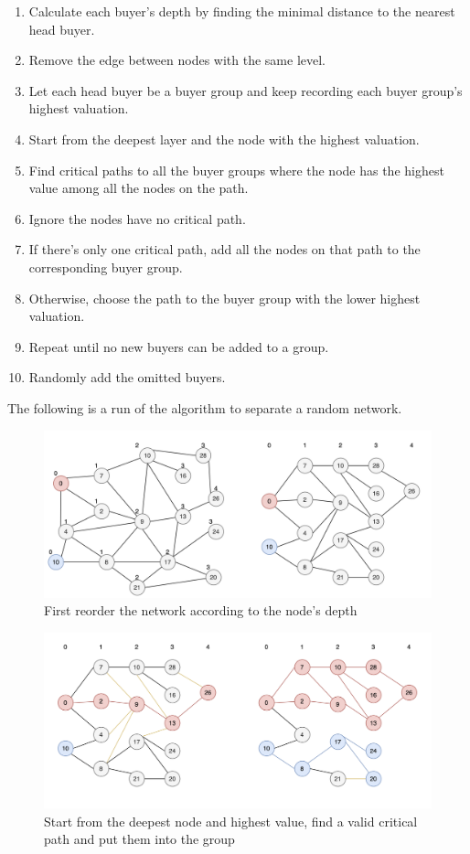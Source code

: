 \documentclass[format=acmsmall, review=false, natbib=false]{acmart}
\begin{document}
\begin{tcolorbox}[title=Algorithm: Graph Division]
	\begin{enumerate}
		\item Calculate each buyer's depth by finding the minimal distance to the nearest head buyer.
		\item Remove the edge between nodes with the same level.
		\item Let each head buyer be a buyer group and keep recording each buyer group's highest valuation.
		\item Start from the deepest layer and the node with the highest valuation.
		\item Find critical paths to all the buyer groups where the node has the highest value among all the nodes on the path.
		\item Ignore the nodes have no critical path.
		\item If there's only one critical path, add all the nodes on that path to the corresponding buyer group.
		\item Otherwise, choose the path to the buyer group with the lower highest valuation.
		\item  Repeat until no new buyers can be added to a group.
		\item Randomly add the omitted buyers.
	\end{enumerate}
\end{tcolorbox}
The following is a run of the algorithm to separate a random network.
\begin{figure}
	\centering
	\includegraphics[width = \textwidth]{image/Graph01.png}
	\caption{First reorder the network according to the node's depth}
	\label{fig:GraphDivision1}
\end{figure}
\begin{figure}
	\centering
	\includegraphics[width = \textwidth]{image/Graph02.png}
	\caption{Start from the deepest node and highest value, find a valid critical path and put them into the group}
	\label{fig:GraphDivision2}
\end{figure}
\end{document}
